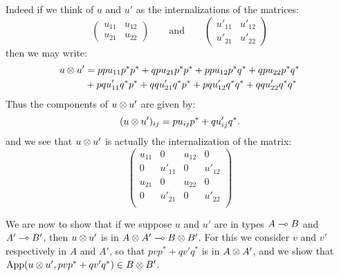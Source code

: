 Indeed if we think of \(u\) and \(u'\) as the internalizations of the
matrices:
\begin{equation*}
  \begin{pmatrix}u_{11}   &  u_{12}\\
                   u_{21}   &  u_{22}
    \end{pmatrix}
  \qquad\text{and}\qquad
    \begin{pmatrix}u'_{11} &  u'_{12}\\
                   u'_{21} &  u'_{22}
    \end{pmatrix}
\end{equation*}
then we may write:
\begin{align*}
    u\otimes u' & = ppu_{11}p^*p^* + qpu_{21}p^*p^* + ppu_{12}p^*q^* + qpu_{22}p^*q^*\\
              & + pqu'_{11}q^*p^* + qqu'_{21}q^*p^* + pqu'_{12}q^*q^* + qqu'_{22}q^*q^*
  \end{align*}
Thus the components of \(u\otimes u'\) are given by:
\begin{equation*}
(u\otimes u')_{ij} = pu_{ij}p^* + qu'_{ij}q^*.
\end{equation*}
and we see that \(u\otimes u'\) is actually the internalization of the
matrix:
\begin{equation*}
    \begin{pmatrix}
      u_{11} &  0       &  u_{12}  &  0       \\
      0      &  u'_{11} &  0       &  u'_{12} \\
      u_{21} &  0       &  u_{22}  &  0       \\
      0      &  u'_{21} &  0       &  u'_{22} \\
    \end{pmatrix}
\end{equation*}

We are now to show that if we suppose \(u\) and \(u'\) are in types
\(A\multimap B\) and \(A'\multimap B'\), then \(u\otimes u'\) is in
\(A\otimes A'\multimap B\otimes B'\). For this we consider \(v\) and \(v'\)
respectively in \(A\) and \(A'\), so that \(pvp^* + qv'q^*\) is in
\(A\otimes A'\), and we show that
\(\mathrm{App}(u\otimes u', pvp^* + qv'q^*)\in B\otimes B'\).


